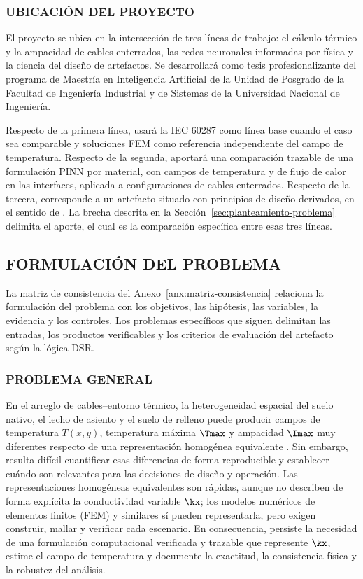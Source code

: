 \subsubsection{UBICACIÓN DEL PROYECTO}

El proyecto se ubica en la intersección de tres líneas de trabajo: el cálculo térmico y la ampacidad de cables enterrados, las redes neuronales informadas por física y la ciencia del diseño de artefactos. Se desarrollará como tesis profesionalizante del programa de Maestría en Inteligencia Artificial de la Unidad de Posgrado de la Facultad de Ingeniería Industrial y de Sistemas de la Universidad Nacional de Ingeniería.

Respecto de la primera línea, usará la IEC 60287 como línea base cuando el caso sea comparable y soluciones FEM como referencia independiente del campo de temperatura. Respecto de la segunda, aportará una comparación trazable de una formulación PINN por material, con campos de temperatura y de flujo de calor en las interfaces, aplicada a configuraciones de cables enterrados. Respecto de la tercera, corresponde a un artefacto situado con principios de diseño derivados, en el sentido de \textcite[342--350]{gregor2013}. La brecha descrita en la Sección~\ref{sec:planteamiento-problema} delimita el aporte, el cual es la comparación específica entre esas tres líneas.

\subsection{FORMULACIÓN DEL PROBLEMA}

La matriz de consistencia del Anexo~\ref{anx:matriz-consistencia} relaciona la formulación del problema con los objetivos, las hipótesis, las variables, la evidencia y los controles. Los problemas específicos que siguen delimitan las entradas, los productos verificables y los criterios de evaluación del artefacto según la lógica DSR.

\subsubsection{PROBLEMA GENERAL}

En el arreglo de cables--entorno térmico, la heterogeneidad espacial del suelo nativo, el lecho de asiento y el suelo de relleno puede producir campos de temperatura $T(x,y)$,  temperatura máxima $\Tmax$ y ampacidad $\Imax$ muy diferentes respecto de una representación homogénea equivalente \parencites[4--6]{enescu2021}[3--4,93--99]{cigre2025}. Sin embargo, resulta difícil cuantificar esas diferencias de forma reproducible y establecer cuándo son relevantes para las decisiones de diseño y operación. Las representaciones homogéneas equivalentes son rápidas, aunque no describen de forma explícita la conductividad variable $\kx$; los modelos numéricos de elementos finitos (FEM) y similares sí pueden representarla, pero exigen construir, mallar y verificar cada escenario. En consecuencia, persiste la necesidad de una formulación computacional verificada y trazable que represente $\kx$, estime el campo de temperatura y documente la exactitud, la consistencia física y la robustez del análisis.

